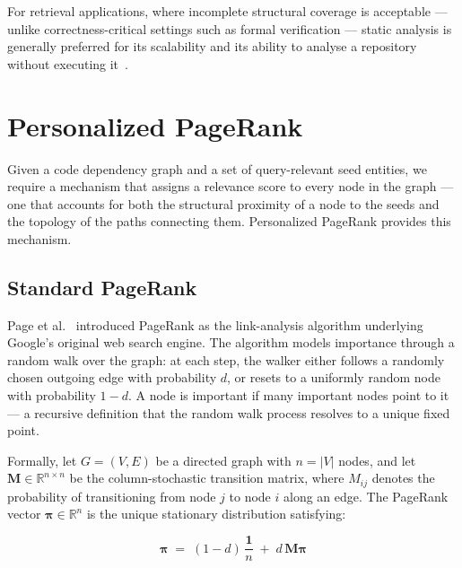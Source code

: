 For retrieval applications, where incomplete structural coverage is acceptable — unlike
correctness-critical settings such as formal verification — static analysis is generally
preferred for its scalability and its ability to analyse a repository without executing
it~\cite{livshits2015soundy}.

\section{Personalized PageRank}
\label{sec:ppr}

Given a code dependency graph and a set of query-relevant seed entities, we require a
mechanism that assigns a relevance score to every node in the graph — one that accounts
for both the structural proximity of a node to the seeds and the topology of the paths
connecting them.
Personalized PageRank provides this mechanism.

\subsection{Standard PageRank}
\label{sec:pagerank}

Page et al.~\cite{page1999pagerank} introduced PageRank as the link-analysis algorithm
underlying Google's original web search engine.
The algorithm models importance through a random walk over the graph: at each step,
the walker either follows a randomly chosen outgoing edge with probability $d$, or
resets to a uniformly random node with probability $1 - d$.
A node is important if many important nodes point to it — a recursive definition that
the random walk process resolves to a unique fixed point.

Formally, let $G = (V, E)$ be a directed graph with $n = |V|$ nodes, and let
$\mathbf{M} \in \mathbb{R}^{n \times n}$ be the column-stochastic transition matrix,
where $M_{ij}$ denotes the probability of transitioning from node $j$ to node $i$
along an edge.
The PageRank vector $\boldsymbol{\pi} \in \mathbb{R}^n$ is the unique
stationary distribution satisfying:

\begin{equation}
    \boldsymbol{\pi}
    \;=\;
    (1 - d)\,\frac{\mathbf{1}}{n}
    \;+\;
    d\,\mathbf{M}\boldsymbol{\pi}
    \label{eq:pagerank}
\end{equation}


